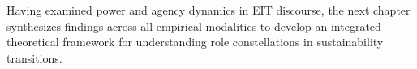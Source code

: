 \documentclass[../main.tex]{subfiles}
\begin{document}
\vspace{1em}
Having examined power and agency dynamics in EIT discourse, the next chapter synthesizes findings across all empirical modalities to develop an integrated theoretical framework for understanding role constellations in sustainability transitions.
\end{document}
